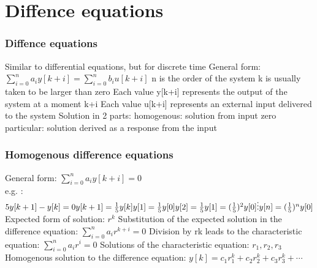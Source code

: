 \section{Diffence equations}
\begin{frame}
	\frametitle{Diffence equations}
	Similar to differential equations, but for discrete time
	General form: $\sum\limits_{i=0}^n a_iy[k+i] = \sum\limits_{i=0}^n b_iu[k+i]$
	n is the order of the system
	k is usually taken to be larger than zero
	Each value y[k+i] represents the output of the system at a moment k+i
	Each value u[k+i] represents an external input delivered to the system
	Solution in 2 parts:
	homogenous: solution from input zero
	particular: solution derived as a response from the input
\end{frame}
\begin{frame}
	\frametitle{Homogenous difference equations}
	General form: $\sum\limits_{i=0}^n a_iy[k+i]= 0$ \\
	e.g. : $5y[k+1] - y[k] = 0
	y[k+1] = \frac{1}{5}y[k] \\
	y[1] = \frac{1}{5} y[0] \\
	y[2] = \frac{1}{5}y[1] = (\frac{1}{5})^2y[0]\\
	\vdots
	y[n] = (\frac{1}{5})^{n}y[0]$
	Expected form of solution: $r^{k}$
	Substitution of the expected solution in the difference equation:
	$\sum\limits_{i=0}^n a_ir^{k+i}= 0$
	Division by rk leads to the characteristic equation:
	$\sum\limits_{i=0}^n a_ir^{i}= 0$
	Solutions of the characteristic equation:
	$r_1,r_2,r_3$
	Homogenous solution to the difference equation: 
	$y[k] = c_1r_1^{k} + c_2r_2^{k} + c_3r_3^{k} + \cdots$
	
	
\end{frame}
